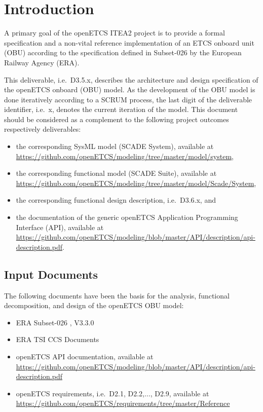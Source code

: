 
\chapter{Introduction}

A primary goal of the openETCS ITEA2 project is to provide a formal specification and a non-vital reference implementation of an ETCS onboard unit (OBU) according to the specification defined in Subset-026 \cite{subset-026} by the European Railway Agency (ERA). 

This deliverable, i.e.~D3.5.x, describes the architecture and design specification of the openETCS onboard (OBU) model. As the development of the OBU model is done iteratively according to a SCRUM process, the last digit of the deliverable identifier, i.e.~x, denotes the current iteration of the model. This document should be considered as a complement to the following project outcomes respectively deliverables:
\begin{itemize}
\item the corresponding SysML model (SCADE System), available at \url{https://github.com/openETCS/modeling/tree/master/model/system},
\item the corresponding functional model (SCADE Suite), available at \url{https://github.com/openETCS/modeling/tree/master/model/Scade/System},
\item the corresponding functional design description, i.e.~D3.6.x, and
\item the documentation of the generic openETCS Application Programming Interface (API), available at \url{https://github.com/openETCS/modeling/blob/master/API/description/api-description.pdf}.
\end{itemize}


\section{Input Documents}

The following documents have been the basis for the analysis, functional decomposition, and design of the openETCS OBU model:
\begin{itemize}
\item ERA Subset-026 \cite{subset-026}, V3.3.0
\item ERA TSI CCS Documents
\item openETCS API documentation, available at \url{https://github.com/openETCS/modeling/blob/master/API/description/api-description.pdf}
\item openETCS requirements, i.e.~D2.1, D2.2,$\ldots$, D2.9, available at \url{https://github.com/openETCS/requirements/tree/master/Reference}
\end{itemize}


